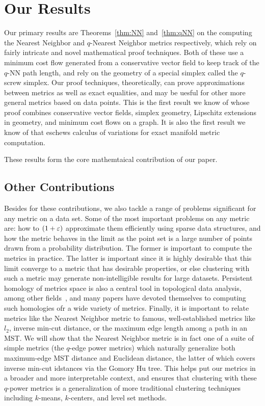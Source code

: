 \section{Our Results}
Our primary results are Theorems~\ref{thm:NN} and~\ref{thm:qNN} on the
computing the Nearest Neighbor and $q$-Nearest Neighbor metrics
respectively, which rely
on fairly intricate and novel mathematical proof techniques. Both of these
use a minimum cost flow generated from a conservative vector field to keep
track of the $q$-NN path length, and rely on the geometry of a special
simplex called the
$q$-screw simplex. Our proof techniques, theoretically, can prove
approximations between metrics as well as exact equalities, and may be
uesful for other more general metrics based on data points. This is the
first result we know of whose proof combines
conservative vector fields, simplex geometry, Lipschitz extensions in
geometry, and minimum cost flows on a graph. It is also the first result we
know of that eschews calculus of variations for exact manifold metric
computation.

These results form the core mathemtaical contribution of our paper.

\subsection{Other Contributions}
Besides for these contributions, we also tackle a range of problems
significant for any metric on a data set.  Some of the most important
problems on any metric are: how to $(1+\varepsilon)$ approximate them efficiently
using sparse data structures, and how the metric behaves in the limit as
the point set is a large number of points drawn from a probability
distribution. The former is important to compute the metrics in practice.
The latter is important since it is highly desirable that
this limit converge to a metric that has desirable properties, or else
clustering with such a metric may generate non-intelligible results for
large datasets.  Persistent homology of metrics space is also a central
tool in topological data analysis, among other fields~\cite{}, and many
papers have devoted themselves to computing such homologies ofr a wide
variety of metrics. Finally, it is important to relate metrics
like the Nearest Neighbor metric to famous, well-established metrics like
$l_2$, inverse min-cut distance, or
the maximum edge length among a path in an MST.
We will show that the
Nearest Neighbor metric is in fact one of a suite of simple metrics (the
$q$-edge power metrics) which naturally generalize both maximum-edge MST
distance and Euclidean distance, the latter of which covers inverse min-cut
idstances via the Gomory Hu tree.  This helps put our metrics in a broader
and more interpretable context, and ensures that clustering with these
$q$-power metrics is a generalization of more traditional clustering
techniques including $k$-means, $k$-centers, and level set methods.

